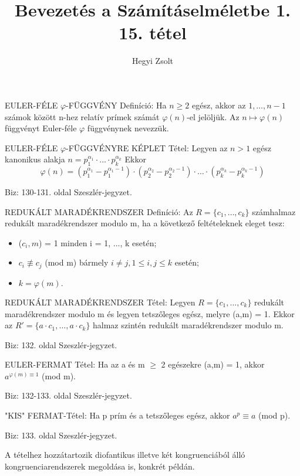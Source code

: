 \documentclass[]{article}
\title{Bevezetés a Számításelméletbe 1.\\{\large 15. tétel}}
\author{Hegyi Zsolt}
\begin{document}
\maketitle{}
\begin{shaded}
EULER-FÉLE $\varphi$-FÜGGVÉNY Definíció: Ha $n \geq 2$ egész, akkor az $1,\ldots,n-1$ számok között n-hez relatív prímek számát $\varphi(n)$-el jelöljük. Az $n\mapsto\varphi(n)$ függvényt Euler-féle $\varphi$ függvénynek nevezzük.
\end{shaded}
\begin{framed}
EULER-FÉLE $\varphi$-FÜGGVÉNYRE KÉPLET Tétel: Legyen az $n > 1$ egész kanonikus alakja $n = p_1^{\alpha_1} \cdot \ldots \cdot p_k^{\alpha_k}$ Ekkor $$\varphi(n) = \left(p_1^{\alpha_1} - p_1^{\alpha_1-1}\right) \cdot \left(p_2^{\alpha_2} - p_2^{\alpha_2-1}\right) \cdot \ldots \cdot
\left(p_k^{\alpha_k} - p_k^{\alpha_k-1}\right)$$
\end{framed}
\begin{leftbar}
Biz: 130-131. oldal Szeszlér-jegyzet.
\end{leftbar}
\begin{shaded}
REDUKÁLT MARADÉKRENDSZER Definíció: Az $R = \{c_1, \ldots, c_k\}$ számhalmaz redukált maradékrendszer modulo m, ha a következő feltételeknek eleget tesz:
\begin{itemize}
\item ($c_i, m$) = 1 minden i = 1, $\ldots$, k esetén;
\item $c_i \not \equiv c_j$ (mod m) bármely $i \neq j, 1 \leq i, j \leq k$ esetén;
\item $k = \varphi(m).$
\end{itemize}
\end{shaded}
\begin{framed}
REDUKÁLT MARADÉKRENDSZER Tétel: Legyen $R = \{c_1, \ldots, c_k\}$ redukált maradékrendszer modulo m és legyen tetszőleges egész, melyre (a,m) = 1. Ekkor az $R' = \{a\cdot c_1, \ldots, a \cdot c_k\}$ halmaz szintén redukált maradékrendszer modulo m.
\end{framed}
\begin{leftbar}
Biz: 132. oldal Szeszlér-jegyzet.
\end{leftbar}
\begin{framed}
EULER-FERMAT Tétel: Ha az a és m $\geq$ 2 egészekre (a,m) = 1, akkor $a^{\varphi(m) \equiv 1}$ (mod m).
\end{framed}
\begin{leftbar}
Biz: 132-133. oldal Szeszlér-jegyzet.
\end{leftbar}
\begin{framed}
"KIS" FERMAT-Tétel: Ha p prím és a tetszőleges egész, akkor $a^p \equiv a$ (mod p).
\end{framed}
\begin{leftbar}
Biz: 133. oldal Szeszlér-jegyzet.
\end{leftbar}
A tételhez hozzátartozik diofantikus illetve két kongruenciából álló kongruenciarendszerek megoldása is, konkrét példán.
\end{document}
